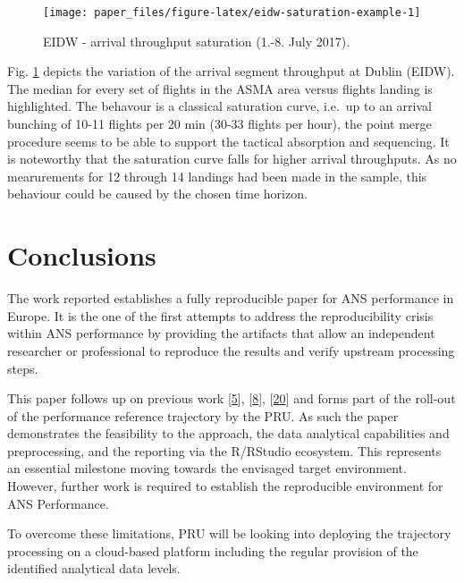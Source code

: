 \documentclass[conference,final,a4paper,]{IEEEtran}
\begin{document}
\begin{figure}[H]

{\centering \texttt{[image: paper\_files/figure-latex/eidw-saturation-example-1]} 

}

\caption{EIDW - arrival throughput saturation
(1.-8. July 2017).}\label{fig:eidw-saturation-example}
\end{figure}

Fig. \ref{fig:eidw-saturation-example} depicts the variation of the
arrival segment throughput at Dublin (EIDW). The median for every set of
flights in the ASMA area versus flights landing is highlighted. The
behavour is a classical saturation curve, i.e.~up to an arrival bunching
of 10-11 flights per 20 min (30-33 flights per hour), the point merge
procedure seems to be able to support the tactical absorption and
sequencing. It is noteworthy that the saturation curve falls for higher
arrival throughputs. As no mearurements for 12 through 14 landings had
been made in the sample, this behaviour could be caused by the chosen
time horizon.

\section{Conclusions}\label{conclusions}

The work reported establishes a fully reproducible paper for ANS
performance in Europe. It is the one of the first attempts to address
the reproducibility crisis within ANS performance by providing the
artifacts that allow an independent researcher or professional to
reproduce the results and verify upstream processing steps.

This paper follows up on previous work
{[}\protect\hyperlink{ref-spinielli_2018}{5}{]},
{[}\protect\hyperlink{ref-koelle_open_2017}{8}{]},
{[}\protect\hyperlink{ref-spinielli_2017}{20}{]} and forms part of the
roll-out of the performance reference trajectory by the PRU. As such the
paper demonstrates the feasibility to the approach, the data analytical
capabilities and preprocessing, and the reporting via the R/RStudio
ecosystem. This represents an essential milestone moving towards the
envisaged target environment. However, further work is required to
establish the reproducible environment for ANS Performance.

To overcome these limitations, PRU will be looking into deploying the
trajectory processing on a cloud-based platform including the regular
provision of the identified analytical data levels.
\end{document}
